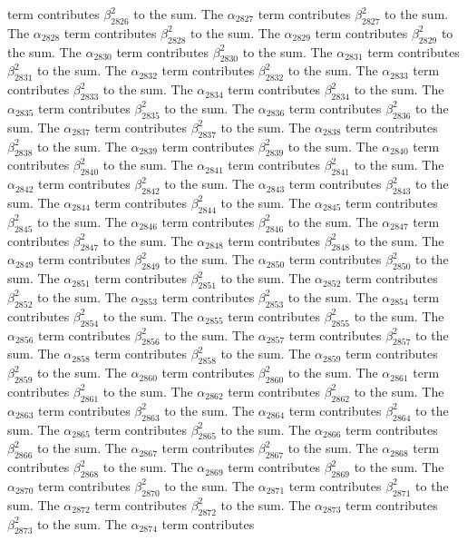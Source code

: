 \begin{lemma}
term contributes $\beta_{2826}^{2}$ to the sum. The $\alpha_{2827}$ term contributes $\beta_{2827}^{2}$ to the sum. The $\alpha_{2828}$ term contributes $\beta_{2828}^{2}$ to the sum. The $\alpha_{2829}$ term contributes $\beta_{2829}^{2}$ to the sum. The $\alpha_{2830}$ term contributes $\beta_{2830}^{2}$ to the sum. The $\alpha_{2831}$ term contributes $\beta_{2831}^{2}$ to the sum. The $\alpha_{2832}$ term contributes $\beta_{2832}^{2}$ to the sum. The $\alpha_{2833}$ term contributes $\beta_{2833}^{2}$ to the sum. The $\alpha_{2834}$ term contributes $\beta_{2834}^{2}$ to the sum. The $\alpha_{2835}$ term contributes $\beta_{2835}^{2}$ to the sum. The $\alpha_{2836}$ term contributes $\beta_{2836}^{2}$ to the sum. The $\alpha_{2837}$ term contributes $\beta_{2837}^{2}$ to the sum. The $\alpha_{2838}$ term contributes $\beta_{2838}^{2}$ to the sum. The $\alpha_{2839}$ term contributes $\beta_{2839}^{2}$ to the sum. The $\alpha_{2840}$ term contributes $\beta_{2840}^{2}$ to the sum. The $\alpha_{2841}$ term contributes $\beta_{2841}^{2}$ to the sum. The $\alpha_{2842}$ term contributes $\beta_{2842}^{2}$ to the sum. The $\alpha_{2843}$ term contributes $\beta_{2843}^{2}$ to the sum. The $\alpha_{2844}$ term contributes $\beta_{2844}^{2}$ to the sum. The $\alpha_{2845}$ term contributes $\beta_{2845}^{2}$ to the sum. The $\alpha_{2846}$ term contributes $\beta_{2846}^{2}$ to the sum. The $\alpha_{2847}$ term contributes $\beta_{2847}^{2}$ to the sum. The $\alpha_{2848}$ term contributes $\beta_{2848}^{2}$ to the sum. The $\alpha_{2849}$ term contributes $\beta_{2849}^{2}$ to the sum. The $\alpha_{2850}$ term contributes $\beta_{2850}^{2}$ to the sum. The $\alpha_{2851}$ term contributes $\beta_{2851}^{2}$ to the sum. The $\alpha_{2852}$ term contributes $\beta_{2852}^{2}$ to the sum. The $\alpha_{2853}$ term contributes $\beta_{2853}^{2}$ to the sum. The $\alpha_{2854}$ term contributes $\beta_{2854}^{2}$ to the sum. The $\alpha_{2855}$ term contributes $\beta_{2855}^{2}$ to the sum. The $\alpha_{2856}$ term contributes $\beta_{2856}^{2}$ to the sum. The $\alpha_{2857}$ term contributes $\beta_{2857}^{2}$ to the sum. The $\alpha_{2858}$ term contributes $\beta_{2858}^{2}$ to the sum. The $\alpha_{2859}$ term contributes $\beta_{2859}^{2}$ to the sum. The $\alpha_{2860}$ term contributes $\beta_{2860}^{2}$ to the sum. The $\alpha_{2861}$ term contributes $\beta_{2861}^{2}$ to the sum. The $\alpha_{2862}$ term contributes $\beta_{2862}^{2}$ to the sum. The $\alpha_{2863}$ term contributes $\beta_{2863}^{2}$ to the sum. The $\alpha_{2864}$ term contributes $\beta_{2864}^{2}$ to the sum. The $\alpha_{2865}$ term contributes $\beta_{2865}^{2}$ to the sum. The $\alpha_{2866}$ term contributes $\beta_{2866}^{2}$ to the sum. The $\alpha_{2867}$ term contributes $\beta_{2867}^{2}$ to the sum. The $\alpha_{2868}$ term contributes $\beta_{2868}^{2}$ to the sum. The $\alpha_{2869}$ term contributes $\beta_{2869}^{2}$ to the sum. The $\alpha_{2870}$ term contributes $\beta_{2870}^{2}$ to the sum. The $\alpha_{2871}$ term contributes $\beta_{2871}^{2}$ to the sum. The $\alpha_{2872}$ term contributes $\beta_{2872}^{2}$ to the sum. The $\alpha_{2873}$ term contributes $\beta_{2873}^{2}$ to the sum. The $\alpha_{2874}$ term contributes 
\end{lemma}
